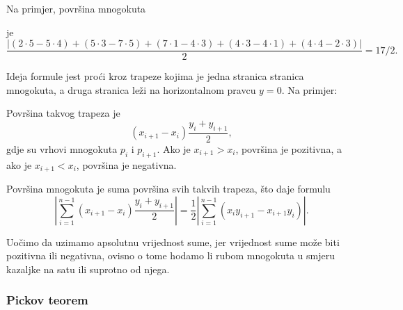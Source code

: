 Na primjer, površina mnogokuta
\begin{center}
\end{center}
je
\[\frac{|(2\cdot5-5\cdot4)+(5\cdot3-7\cdot5)+(7\cdot1-4\cdot3)+(4\cdot3-4\cdot1)+(4\cdot4-2\cdot3)|}{2} = 17/2.\]

Ideja formule jest proći kroz trapeze
kojima je jedna stranica stranica mnogokuta,
a druga stranica leži na horizontalnom pravcu $y=0$.
Na primjer:
\begin{center}
\end{center}
Površina takvog trapeza je
\[(x_{i+1}-x_{i}) \frac{y_i+y_{i+1}}{2},\]
gdje su vrhovi mnogokuta $p_i$ i $p_{i+1}$.
Ako je $x_{i+1}>x_{i}$, površina je pozitivna,
a ako je $x_{i+1}<x_{i}$, površina je negativna.

Površina mnogokuta je suma površina
svih takvih trapeza, što daje formulu
\[|\sum_{i=1}^{n-1} (x_{i+1}-x_{i}) \frac{y_i+y_{i+1}}{2}| =
\frac{1}{2} |\sum_{i=1}^{n-1} (x_i y_{i+1} - x_{i+1} y_i)|.\]

Uočimo da uzimamo apsolutnu vrijednost sume,
jer vrijednost sume može biti pozitivna ili negativna,
ovisno o tome hodamo li rubom mnogokuta
u smjeru kazaljke na satu ili suprotno od njega.

\subsubsection{Pickov teorem}

